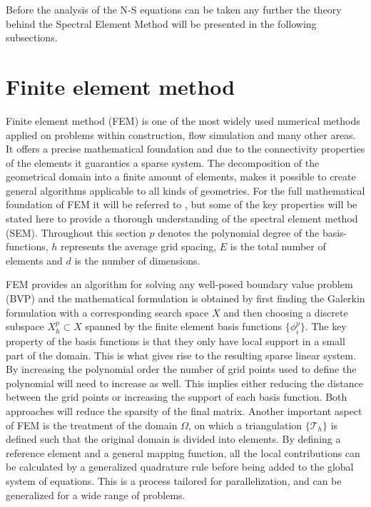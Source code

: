 Before the analysis of the N-S equations can be taken any further the theory behind the Spectral Element Method will be presented in the following
subsections.


\section{Finite element method}

Finite element method (FEM) is one of the most widely used numerical methods applied on problems within construction, flow simulation and many 
other areas. It offers a precise mathematical foundation and due to the connectivity properties of the elements 
it guaranties a sparse system. The decomposition of the geometrical domain into a finite amount of elements,
makes it possible to create general algorithms applicable to all kinds of geometries. 
For the full mathematical foundation of FEM it will be referred to \cite{Quarteroni}, but some of the key properties will be stated here
to provide a thorough understanding of the spectral element method (SEM). 
Throughout this section $p$ denotes the polynomial degree of the basis-functions, $h$ represents the average grid spacing, $E$ is the total
number of elements and $d$ is the number of dimensions. 

FEM provides an algorithm for solving any well-posed boundary value problem (BVP) and the mathematical 
formulation is obtained by first finding the Galerkin
formulation with a corresponding search space $X$ and then choosing a discrete subspace $X^p_h\subset X$ 
spanned by the finite element basis functions $\{\phi^p_i\}$.
The key property of the basis functions is that they only have local support in a small part of the domain. 
This is what gives rise to the resulting sparse linear system. 
By increasing the polynomial order the number of grid points used to define the polynomial will need to increase as well.
This implies either reducing the distance between the grid points or increasing the support of each basis function.
Both approaches will reduce the sparsity of the final matrix.
Another important aspect of FEM is the treatment of the domain $\Omega$, 
on which a triangulation $\{\mathcal{T}_h\}$ is defined such that the original domain is divided into elements.
By defining a reference element and a general mapping function, all the local contributions can be calculated by a 
generalized quadrature rule before being added to the global system of equations. This is a process tailored for parallelization, and can 
be generalized for a wide range of problems.

